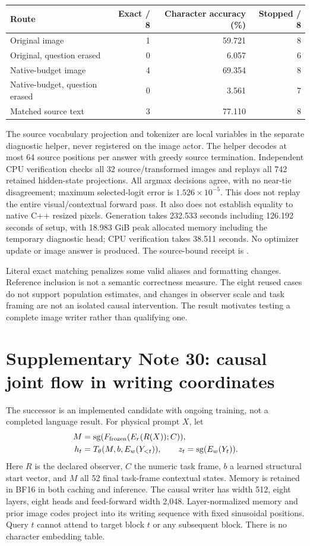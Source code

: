 \documentclass[10pt,a4paper]{article}
\begin{document}
\begin{center}\small
\begin{tabular}{lrrr}\toprule
Route & Exact / 8 & Character accuracy (\%) & Stopped / 8\\\midrule
Original image & 1 & 59.721 & 8\\
Original, question erased & 0 & 6.057 & 6\\
Native-budget image & 4 & 69.354 & 8\\
Native-budget, question erased & 0 & 3.561 & 7\\
Matched source text & 3 & 77.110 & 8\\\bottomrule
\end{tabular}
\end{center}

The source vocabulary projection and tokenizer are local variables in the
separate diagnostic helper, never registered on the image actor. The helper
decodes at most 64 source positions per answer with greedy source termination.
Independent CPU verification checks all 32 source/transformed images and
replays all 742 retained hidden-state projections. All argmax decisions agree,
with no near-tie disagreement; maximum selected-logit error is
$1.526\times10^{-5}$. This does not replay the entire visual/contextual forward
pass. It also does not establish equality to native C++ resized pixels.
Generation takes 232.533 seconds including 126.192 seconds of setup, with
18.983 GiB peak allocated memory including the temporary diagnostic head;
CPU verification takes 38.511 seconds. No optimizer update or image answer
is produced. The source-bound receipt is
.

Literal exact matching penalizes some valid aliases and formatting changes.
Reference inclusion is not a semantic correctness measure. The eight reused
cases do not support population estimates, and changes in observer scale and
task framing are not an isolated causal intervention. The result motivates
testing a complete image writer rather than qualifying one.

\section*{Supplementary Note 30: causal joint flow in writing coordinates}
The successor is an implemented candidate with ongoing training, not a
completed language result. For physical prompt $X$, let
\begin{align}
 M &= \operatorname{sg}(F_{\rm frozen}(E_r(R(X));C)),\\
 h_t &= T_\theta(M,b,E_w(Y_{<t})),\qquad z_t=\operatorname{sg}(E_w(Y_t)).
\end{align}
Here $R$ is the declared observer, $C$ the numeric task frame, $b$ a learned
structural start vector, and $M$ all 52 final task-frame contextual states.
Memory is retained in BF16 in both caching and inference. The causal writer
has width 512, eight layers, eight heads and feed-forward width 2,048.
Layer-normalized memory and prior image codes project into its writing
sequence with fixed sinusoidal positions. Query $t$ cannot attend to target
block $t$ or any subsequent block. There is no character embedding table.
\end{document}
